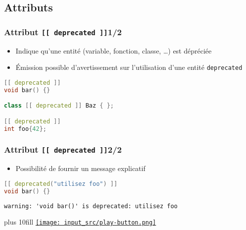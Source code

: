\documentclass[C++.tex]{subfiles}
\begin{document}
\subsection*{Attributs}
\begin{frame}[fragile]
	\frametitle{Attribut \lstinline|[[ deprecated ]]|\titlehfill{}1/2}
	\begin{itemize}
		\item Indique qu'une entité (variable, fonction, classe, \ldots) est dépréciée
		\item Émission possible d'avertissement sur l'utilisation d'une entité \lstinline|deprecated|

	\end{itemize}

	\begin{lstlisting}[language=C++]
[[ deprecated ]]
void bar() {}

class [[ deprecated ]] Baz { };

[[ deprecated ]]
int foo{42};\end{lstlisting}
\end{frame}

\begin{frame}[fragile]
	\frametitle{Attribut \lstinline|[[ deprecated ]]|\titlehfill{}2/2}
	\begin{itemize}
		\item Possibilité de fournir un message explicatif
	\end{itemize}

	\begin{lstlisting}[language=C++]
[[ deprecated("utilisez foo") ]]
void bar() {}\end{lstlisting}

	\begin{lstlisting}
warning: 'void bar()' is deprecated: utilisez foo\end{lstlisting}

	\vskip 10mm plus 10fill
	\hfill
	\href{https://godbolt.org/#g:!((g:!((g:!((h:codeEditor,i:(filename:'1',fontScale:14,fontUsePx:'0',j:1,lang:c%2B%2B,selection:(endColumn:1,endLineNumber:22,positionColumn:1,positionLineNumber:22,selectionStartColumn:1,selectionStartLineNumber:22,startColumn:1,startLineNumber:22),source:'%23include+%3Ciostream%3E%0A%0A%5B%5B+deprecated(%22Utilisez+Foo%22)+%5D%5D%0Astatic+void+bar()%0A%7B%0A%7D%0A%0Aclass+%5B%5B+deprecated+%5D%5D+Baz%0A%7B%0A%7D%3B%0A%0Aint+main()%0A%7B%0A++bar()%3B%0A%0A++Baz+baz%3B%0A%0A++%5B%5B+deprecated+%5D%5D%0A++int+foo%7B42%7D%3B%0A++std::cout+%3C%3C+foo+%3C%3C+!'%5Cn!'%3B%0A%7D%0A'),l:'5',n:'0',o:'C%2B%2B+source+%231',t:'0')),k:50,l:'4',n:'0',o:'',s:0,t:'0'),(g:!((h:executor,i:(argsPanelShown:'1',compilationPanelShown:'0',compiler:g112,compilerOutShown:'0',execArgs:'',execStdin:'',fontScale:14,fontUsePx:'0',j:1,lang:c%2B%2B,libs:!((name:boost,ver:'175')),options:'-std%3Dc%2B%2B14',source:1,stdinPanelShown:'1',tree:'1',wrap:'0'),l:'5',n:'0',o:'Executor+x86-64+gcc+11.2+(C%2B%2B,+Editor+%231)',t:'0')),header:(),k:50,l:'4',n:'0',o:'',s:0,t:'0')),l:'2',n:'0',o:'',t:'0')),version:4}{\texttt{[image: input\_src/play-button.png]}}
\end{frame}
\end{document}
